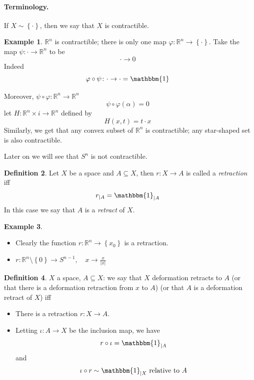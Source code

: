 \documentclass[11pt,a4paper]{article}
\theoremstyle{definition}
\newtheorem{definition}{Definition}[section]
\newtheorem{example}[definition]{Example}
\theoremstyle{plain}
\theoremstyle{remark}
\newcommand{\R}{\mathbb{R}}
\renewcommand{\set}[1]{\left\{ #1 \right\}}
\newcommand{\1}{\mathbbm{1}}
\begin{document}
\paragraph{Terminology.} If $X \sim \set{\cdot}$, then we say that $X$ is contractible. 
\begin{example}
    $\R^n$ is contractible; there is only one map $\varphi \colon \R^n \to \set{\cdot}$. Take the map $\psi \colon \cdot \to \R^n$ to be
    $$\cdot \to 0$$
    Indeed 
    $$\varphi \circ \psi \colon \cdot \to \cdot = \1$$

    Moreover, $\psi \circ \varphi \colon \R^n \to \R^n$ 
    $$\psi \circ \varphi (\alpha) = 0$$
    let $H \colon \R^n \times i \to \R^n$ defined by 
    $$H(x, t) = t \cdot x$$
    Similarly, we get that any convex subset of $\R^n$ is contractible; any star-shaped set is also contractible.

    Later on we will see that $S^n$ is not contractible. 
\end{example}

\begin{definition}
    Let $X$ be a space and $A \subseteq X$, then $r \colon X \to A$ is called a \emph{retraction} iff 
    $$r_{|A} = \1_{|A}$$
    In this case we say that $A$ is a \emph{retract} of $X$.
\end{definition}


\begin{example}
    \begin{itemize}
        \item Clearly the function $r \colon \R^n \to \set{x_0}$ is a retraction.
        \item $r \colon \R^n \setminus \set{0} \to S^{n-1}, \quad x \to \frac{x}{|x|}$
    \end{itemize}
\end{example}

\begin{definition}
    $X$ a space, $A \subseteq X$: we say that $X$ deformation retracts to $A$ (or that there is a deformation retraction from $x$ to $A$) 
    (or that $A$ is a deformation retract of $X$) iff 
    \begin{itemize}
        \item There is a retraction $r \colon X \to A$. 
        \item Letting $\iota \colon A \to X$ be the inclusion map, we have 
        $$r \circ \iota = \1_{|A}$$
        and 
        $$\iota \circ r \sim \1_{|X} \text{ relative to $A$}$$
    \end{itemize}
\end{definition}
\end{document}
